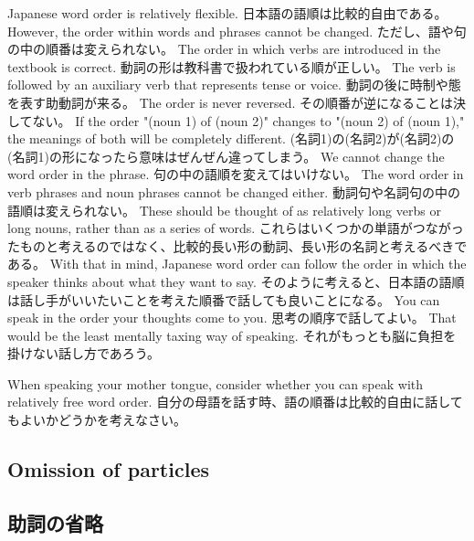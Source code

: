 \documentclass[uplatex,dvipdfmx,b5paper,english,10pt]{jsbook}
\begin{document}
\ifEnglish
Japanese word order is relatively flexible.
\else
日本語の語順は比較的自由である。
\fi
\ifEnglish
However, the order within words and phrases cannot be changed.
\else
ただし、語や句の中の順番は変えられない。
\fi
\ifEnglish
The order in which verbs are introduced in the textbook is correct.
\else
動詞の形は教科書で扱われている順が正しい。
\fi
\ifEnglish
The verb is followed by an auxiliary verb that represents tense or voice.
\else
動詞の後に時制や態を表す助動詞が来る。
\fi
\ifEnglish
The order is never reversed.
\else
その順番が逆になることは決してない。
\fi
\ifEnglish
If the order "(noun 1) of (noun 2)" changes to "(noun 2) of (noun 1)," the meanings of both will be completely different.
\else
(名詞1)の(名詞2)が(名詞2)の(名詞1)の形になったら意味はぜんぜん違ってしまう。
\fi
\ifEnglish
We cannot change the word order in the phrase.
\else
句の中の語順を変えてはいけない。
\fi
\ifEnglish
The word order in verb phrases and noun phrases cannot be changed either.
\else
動詞句や名詞句の中の語順は変えられない。
\fi
\ifEnglish
These should be thought of as relatively long verbs or long nouns, rather than as a series of words.
\else
これらはいくつかの単語がつながったものと考えるのではなく、比較的長い形の動詞、長い形の名詞と考えるべきである。
\fi
\ifEnglish
With that in mind, Japanese word order can follow the order in which the speaker thinks about what they want to say.
\else
そのように考えると、日本語の語順は話し手がいいたいことを考えた順番で話しても良いことになる。
\fi
\ifEnglish
You can speak in the order your thoughts come to you.
\else
思考の順序で話してよい。
\fi
\ifEnglish
That would be the least mentally taxing way of speaking.
\else
それがもっとも脳に負担を掛けない話し方であろう。
\fi

\begin{toiquestion}
 \ifEnglish
 When speaking your mother tongue, consider whether you can speak with relatively free word order.
 \else
 自分の母語を話す時、語の順番は比較的自由に話してもよいかどうかを考えなさい。
 \fi
\end{toiquestion}

\ifEnglish
\subsection{Omission of particles}
\else
\subsection{助詞の省略}
\fi
\end{document}
